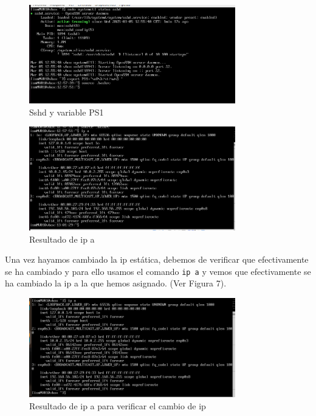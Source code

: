 \begin{figure}
    \centering
    \includegraphics[width=0.8\textwidth]{images/Bloque1/sshd_PS1.png}
    \caption{Sshd y variable PS1}
\end{figure}

\begin{figure}
    \centering
    \includegraphics[width=0.8\textwidth]{images/Bloque1/resultado_ipa.png}
    \caption{Resultado de ip a}
\end{figure}

Una vez hayamos cambiado la ip estática, debemos de verificar que efectivamente se ha cambiado y para ello usamos el comando \texttt{ip a} y vemos que efectivamente se ha cambiado la ip a la que hemos asignado. (Ver Figura 7).

\begin{figure}
    \centering
    \includegraphics[width=0.8\textwidth]{images/Bloque1/ping2.png}
    \caption{Resultado de ip a para verificar el cambio de ip}
\end{figure}

